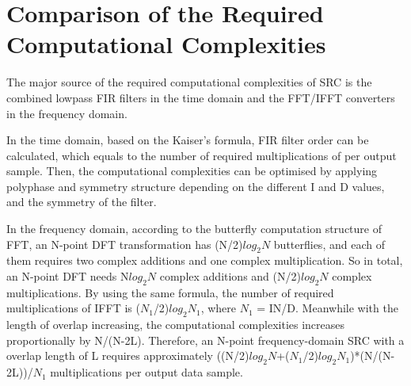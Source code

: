 \documentclass[letterpaper,12pt]{article}
\begin{document}
\section{Comparison of the Required Computational Complexities}

The major source of the required computational complexities of SRC is the combined lowpass  FIR filters in the time domain and the FFT/IFFT converters in the frequency domain.

In the time domain, based on the Kaiser's formula, FIR filter order can be calculated, which equals to the number of required multiplications of per output sample. Then, the computational complexities can be optimised by applying polyphase and symmetry structure depending on the different I and D values, and the symmetry of the filter.

In the frequency domain, according to the butterfly computation structure of FFT, an N-point DFT transformation has (N/2)$log_{2}N$ butterflies, and each of them requires two complex additions and one complex multiplication. So in total, an N-point DFT needs N$log_{2}N$ complex additions and (N/2)$log_{2}N$ complex multiplications. By using the same formula, the number of required multiplications of IFFT is ($N_{1}$/2)$log_{2}$$N_{1}$, where $N_{1}$ = IN/D. Meanwhile with the length of overlap increasing, the computational complexities increases proportionally by N/(N-2L). Therefore, an N-point frequency-domain SRC with a overlap length of L requires approximately ((N/2)$log_{2}N$+($N_{1}$/2)$log_{2}$$N_{1}$)*(N/(N-2L))/$N_{1}$ multiplications per output data sample.
\end{document}
